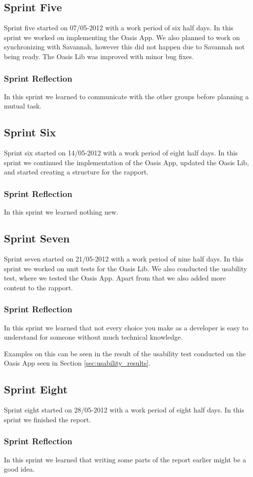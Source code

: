 \subsection{Sprint Five}
Sprint five started on 07/05-2012 with a work period of six half days.
In this sprint we worked on implementing the Oasis App.
We also planned to work on synchronizing with Savannah, however this did not happen due to Savannah not being ready.
The Oasis Lib was improved with minor bug fixes.

\subsubsection{Sprint Reflection}
In this sprint we learned to communicate with the other groups before planning a mutual task.

\subsection{Sprint Six}
Sprint six started on 14/05-2012 with a work period of eight half days. In this sprint we continued the implementation of the Oasis App, updated the Oasis Lib, and started creating a structure for the rapport.

\subsubsection{Sprint Reflection}
In this sprint we learned nothing new.

\subsection{Sprint Seven}
Sprint seven started on 21/05-2012 with a work period of nine half days.
In this sprint we worked on unit tests for the Oasis Lib.
We also conducted the usability test, where we tested the Oasis App.
Apart from that we also added more content to the rapport.

\subsubsection{Sprint Reflection}
In this sprint we learned that not every choice you make as a developer is easy to understand for someone without much technical knowledge.

Examples on this can be seen in the result of the usability test conducted on the Oasis App seen in Section \vref{sec:usability_results}.

\subsection{Sprint Eight}
Sprint eight started on 28/05-2012 with a work period of eight half days. In this sprint we finished the report.

\subsubsection{Sprint Reflection}
In this sprint we learned that writing some parts of the report earlier might be a good idea.